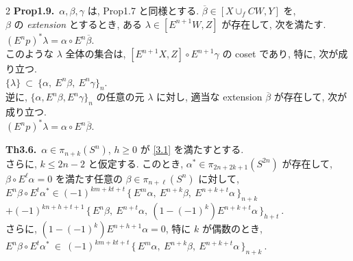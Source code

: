 \documentclass[10pt, leqno]{ltjsarticle}
\newcommand{\Ex}{E}        %
\newcommand{\todai}[2][]{\{\,#2\,\}_{#1}}      %
\newcommand{\pis}[2]{\pi_{#1}(#2)}       %
\numberwithin{equation}{section}
\theoremstyle{plain}
\theoremstyle{definition}
\theoremstyle{remark}
\begin{document}
\begin{paracol}{2}
\noindent
\textbf{Prop1.9.}\
$\alpha,\beta,\gamma$ は, \textnormal{Prop1.7} と同様とする. 
$\overline\beta\in[X\cup_f CW, Y]$ を,\\
$\beta$ の \emph{extension} とするとき,
ある $\lambda\in[\Ex^{n+1}W, Z]$ が存在して, 次を満たす.\\
\(
(\Ex^n p)^*\lambda=\alpha\circ \Ex^n\overline\beta.
\)\\
このような $\lambda$ 全体の集合は,
\(
[\Ex^{n+1}X, Z]\circ \Ex^{n+1}\gamma
\)
の coset であり, 特に, 次が成り立つ.\\
\(
\{\lambda\}\ \subset\ \{\alpha,\ \Ex^n\beta,\ \Ex^n\gamma\}_n .
\)\\
逆に, $\{\alpha,\Ex^n\beta,\Ex^n\gamma\}_n$ の任意の元 $\lambda$ に対し, 
適当な extension $\overline\beta$ が存在して,
次が成り立つ.\\
\(
(\Ex^n p)^*\lambda=\alpha\circ \Ex^n\overline\beta.
\)

\noindent
\textbf{Th3.6.}\
$\alpha\in\pis{n+k}{S^{n}}$, $h\ge0$ が \eqref{3.1} を満たすとする.\\ 
さらに, $k\le 2n-2$ と仮定する.
このとき,
\(\alpha^{*}\in\pis{2n+2k+1}{S^{2n}}\)
が存在して, \\
\(\beta\circ \Ex^{\ell}\alpha=0\)
を満たす任意の $\beta\in\pis{n+\ell}{S^{n}}$ に対して, \\
\(\Ex^{n}\beta \circ \Ex^{t}\alpha^{*}
\in (-1)^{km+kt+t}\,\todai[n+k]{\Ex^{m}\alpha,\ 
  \Ex^{n+k}\beta,\ \Ex^{n+k+t}\alpha}\)\\
\(+ (-1)^{kn+h+t+1}\,\todai[h+t]{\Ex^{n}\beta,\ 
  \Ex^{n+t}\alpha,\ (1-(-1)^k)\Ex^{n+k+t}\alpha}\ .\)\\
さらに,
\((1-(-1)^k)\Ex^{n+h+1}\alpha=0\), 特に \(k\) が偶数のとき, \\
\(
\Ex^{n}\beta\circ \Ex^{t}\alpha^{*}\ \in\
(-1)^{km+kt+t}\,\todai[n+k]{\Ex^{m}\alpha,\ \Ex^{n+k}\beta,\ \Ex^{n+k+t}\alpha}\ .
\)



\end{paracol}
\end{document}
